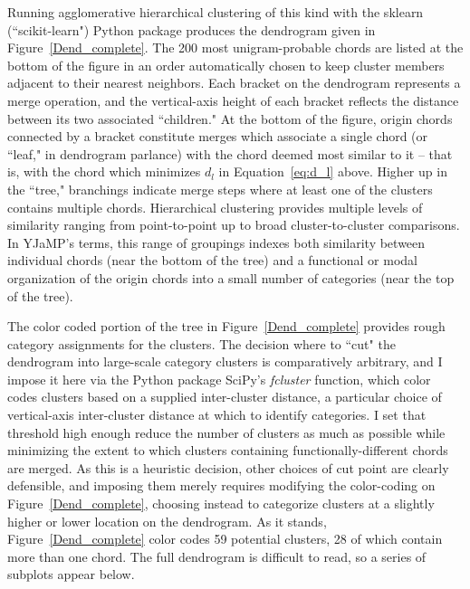 Running agglomerative hierarchical clustering of this kind with the sklearn (``scikit-learn") Python package produces the dendrogram given in Figure~\ref{Dend_complete}.  The 200 most unigram-probable chords are listed at the bottom of the figure in an order automatically chosen to keep cluster members adjacent to their nearest neighbors.  Each bracket on the dendrogram represents a merge operation, and the vertical-axis height of each bracket reflects the distance between its two associated ``children."  At the bottom of the figure, origin chords connected by a bracket constitute merges which associate a single chord (or ``leaf," in dendrogram parlance) with the chord deemed most similar to it -- that is, with the chord which minimizes $d_l$ in Equation~\ref{eq:d_l} above.  Higher up in the ``tree," branchings indicate merge steps where at least one of the clusters contains multiple chords.  Hierarchical clustering provides multiple levels of similarity ranging from point-to-point up to broad cluster-to-cluster comparisons.  In YJaMP's terms, this range of groupings indexes both similarity between individual chords (near the bottom of the tree) and a functional or modal organization of the origin chords into a small number of categories (near the top of the tree).

The color coded portion of the tree in Figure~\ref{Dend_complete} provides rough category assignments for the clusters.  The decision where to ``cut" the dendrogram into large-scale category clusters is comparatively arbitrary, and I impose it here via the Python package SciPy's \emph{fcluster} function, which color codes clusters based on a supplied inter-cluster distance, a particular choice of vertical-axis inter-cluster distance at which to identify categories.  I set that threshold high enough reduce the number of clusters as much as possible while minimizing the extent to which clusters containing functionally-different chords are merged.  As this is a heuristic decision, other choices of cut point are clearly defensible, and imposing them merely requires modifying the color-coding on Figure~\ref{Dend_complete}, choosing instead to categorize clusters at a slightly higher or lower location on the dendrogram.  As it stands, Figure~\ref{Dend_complete} color codes 59 potential clusters, 28 of which contain more than one chord.  The full dendrogram is difficult to read, so a series of subplots appear below.

